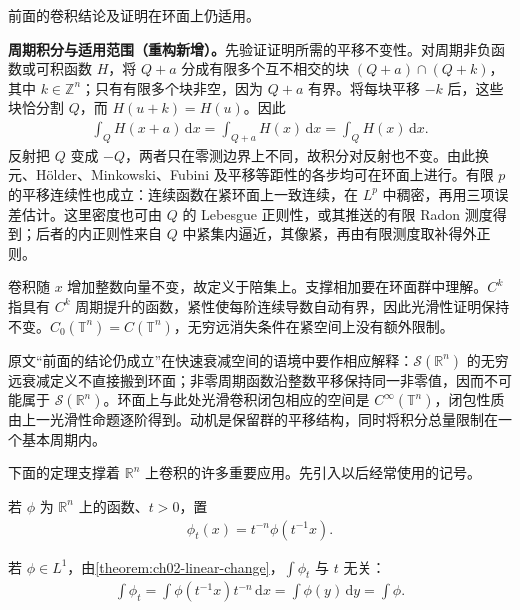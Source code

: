 \documentclass[../../main.tex]{subfiles}
\begin{document}
前面的卷积结论及证明在环面上仍适用。
\begin{remark}
\textbf{周期积分与适用范围（重构新增）。}先验证证明所需的平移不变性。对周期非负函数或可积函数 $H$，将 $Q+a$ 分成有限多个互不相交的块 $(Q+a)\cap(Q+k)$，其中 $k\in\mathbb Z^n$；只有有限多个块非空，因为 $Q+a$ 有界。将每块平移 $-k$ 后，这些块恰分割 $Q$，而 $H(u+k)=H(u)$。因此
\begin{align*}
\int_Q H(x+a)\,\mathrm dx=\int_{Q+a}H(x)\,\mathrm dx=\int_QH(x)\,\mathrm dx.
\end{align*}
反射把 $Q$ 变成 $-Q$，两者只在零测边界上不同，故积分对反射也不变。由此换元、Hölder、Minkowski、Fubini 及平移等距性的各步均可在环面上进行。有限 $p$ 的平移连续性也成立：连续函数在紧环面上一致连续，在 $L^p$ 中稠密，再用三项误差估计。这里密度也可由 $Q$ 的 Lebesgue 正则性，或其推送的有限 Radon 测度得到；后者的内正则性来自 $Q$ 中紧集内逼近，其像紧，再由有限测度取补得外正则。

卷积随 $x$ 增加整数向量不变，故定义于陪集上。支撑相加要在环面群中理解。$C^k$ 指具有 $C^k$ 周期提升的函数，紧性使每阶连续导数自动有界，因此光滑性证明保持不变。$C_0(\mathbb T^n)=C(\mathbb T^n)$，无穷远消失条件在紧空间上没有额外限制。

原文“前面的结论仍成立”在快速衰减空间的语境中要作相应解释：$\mathcal S(\mathbb R^n)$ 的无穷远衰减定义不直接搬到环面；非零周期函数沿整数平移保持同一非零值，因而不可能属于 $\mathcal S(\mathbb R^n)$。环面上与此处光滑卷积闭包相应的空间是 $C^\infty(\mathbb T^n)$，闭包性质由上一光滑性命题逐阶得到。动机是保留群的平移结构，同时将积分总量限制在一个基本周期内。
\end{remark}
下面的定理支撑着 $\mathbb R^n$ 上卷积的许多重要应用。先引入以后经常使用的记号。
\begin{definition}[保持积分的伸缩]\label{definition:ch08-dilation}
若 $\phi$ 为 $\mathbb R^n$ 上的函数、$t>0$，置
\begin{align}\label{eq:ch08-dilation}
\phi_t(x)=t^{-n}\phi(t^{-1}x).
\end{align}
\end{definition}
若 $\phi\in L^1$，由\cref{theorem:ch02-linear-change}，$\int\phi_t$ 与 $t$ 无关：
\begin{align*}
\int\phi_t=\int\phi(t^{-1}x)t^{-n}\,\mathrm dx
=\int\phi(y)\,\mathrm dy=\int\phi.
\end{align*}
\end{document}
